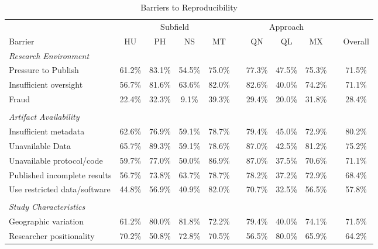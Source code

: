 \documentclass[]{interact}
\theoremstyle{plain}%
\theoremstyle{definition}
\theoremstyle{remark}
\begin{document}
\newpage
\begin{table}[h]
    \centering
    \begin{threeparttable}
    \caption{Barriers to Reproducibility}
    \begin{tabular}{l c c c c c c c c c c}
         \hline
                    & \multicolumn{4}{1}{Subfield}  & & \multicolumn{3}{1}{Approach} & & \\
         Barrier    & HU & PH & NS & MT            & & QN & QL & MX              & & Overall \\
         \hline
         \textit{Research Environment}      & & & & & & & & & & \\
         Pressure to Publish                & 61.2\% & 83.1\% & 54.5\% & 75.0\% & & 77.3\% & 47.5\% & 75.3\% & & 71.5\% \\
         Insufficient oversight             & 56.7\% & 81.6\% & 63.6\% & 82.0\% & & 82.6\% & 40.0\% & 74.2\% & & 71.1\% \\
         Fraud                              & 22.4\% & 32.3\% & 9.1\%  & 39.3\% & & 29.4\% & 20.0\% & 31.8\% & & 28.4\% \\
                                            & & & & & & & & & &\\
         \textit{Artifact Availability}     & & & & & & & & & & \\
         Insufficient metadata              & 62.6\% & 76.9\% & 59.1\% & 78.7\% & & 79.4\% & 45.0\% & 72.9\% & & 80.2\% \\
         Unavailable Data                   & 65.7\% & 89.3\% & 59.1\% & 78.6\% & & 87.0\% & 42.5\% & 81.2\% & & 75.2\% \\
         Unavailable protocol/code          & 59.7\% & 77.0\% & 50.0\% & 86.9\% & & 87.0\% & 37.5\% & 70.6\% & & 71.1\% \\
         Published incomplete results       & 56.7\% & 73.8\% & 63.7\% & 78.7\% & & 78.2\% & 37.2\% & 72.9\% & & 68.4\% \\
         Use restricted data/software       & 44.8\% & 56.9\% & 40.9\% & 82.0\% & & 70.7\% & 32.5\% & 56.5\% & & 57.8\% \\
                                            & & & & & & & & & &\\
         \textit{Study Characteristics}     & & & & & & & & & & \\
         Geographic variation               & 61.2\% & 80.0\% & 81.8\% & 72.2\% & & 79.4\% & 40.0\% & 74.1\% & & 71.5\% \\
         Researcher positionality           & 70.2\% & 50.8\% & 72.8\% & 70.5\% & & 56.5\% & 80.0\% & 65.9\% & & 64.2\% \\

\end{tabular}
\end{threeparttable}
\end{table}
\end{document}
